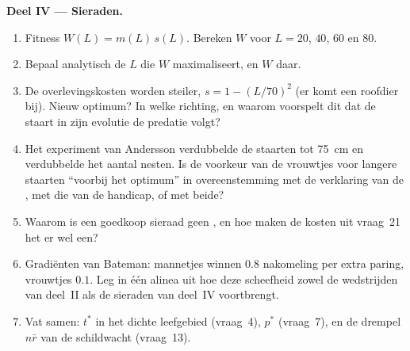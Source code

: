 \begin{problem}
\medskip
\noindent\textbf{Deel IV --- Sieraden.}
\begin{enumerate}[resume]
  \item Fitness $W(L) = m(L)\,s(L)$. Bereken $W$ voor $L = 20$, $40$, $60$
        en $80$.
  \item Bepaal analytisch de $L$ die $W$ maximaliseert, en $W$ daar.
  \item De overlevingskosten worden steiler, $s = 1 - (L/70)^{2}$ (er
        komt een roofdier bij). Nieuw optimum? In welke richting, en
        waarom voorspelt dit dat de staart in zijn evolutie de predatie
        volgt?
  \item Het experiment van Andersson verdubbelde de staarten tot
        \qty{75}{cm} en verdubbelde het aantal nesten. Is de voorkeur
        van de vrouwtjes voor langere staarten ``voorbij het optimum''
        in overeenstemming met de verklaring van de , met die van de handicap, of met beide?
  \item Waarom is een goedkoop sieraad geen , en hoe
        maken de kosten uit vraag~21 het er wel een?
  \item Gradiënten van Bateman: mannetjes winnen $0.8$ nakomeling per
        extra paring, vrouwtjes $0.1$. Leg in één alinea uit hoe deze
        scheefheid zowel de wedstrijden van deel~II als de sieraden van
        deel~IV voortbrengt.
  \item Vat samen: $t^{*}$ in het dichte leefgebied (vraag~4), $p^{*}$
        (vraag~7), en de drempel $n\bar r$ van de schildwacht
        (vraag~13).
\end{enumerate}
\end{problem}
